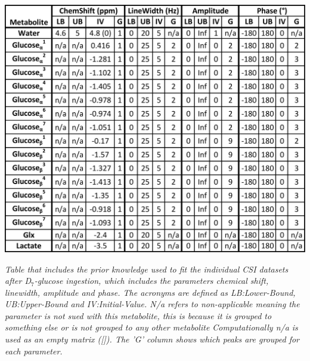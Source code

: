 \begin{table}[H]
    \centering
    \includegraphics[width = 1\textwidth]{Figures/Glucose/Prior_Table.png}
    \caption{\textit{Table that includes the prior knowledge used to fit the individual \ac{CSI} datasets after D$_7$-glucose ingestion, which includes the parameters chemical shift, linewidth, amplitude and phase. The acronyms are defined as LB:Lower-Bound, UB:Upper-Bound and IV:Initial-Value. N/a refers to non-applicable meaning the parameter is not sued with this metabolite, this is because it is grouped to something else or is not grouped to any other metabolite Computationally n/a is used as an empty matrix ([]). The 'G' column shows which peaks are grouped for each parameter.}}
    \label{fig:Glu:Prior}
\end{table}

